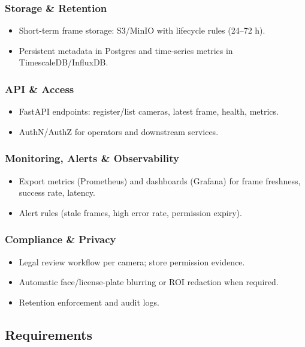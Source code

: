 \subsubsection{Storage \& Retention}
\begin{itemize}
  \item Short-term frame storage: S3/MinIO with lifecycle rules (24--72 h).
  \item Persistent metadata in Postgres and time-series metrics in TimescaleDB/InfluxDB.
\end{itemize}

\subsubsection{API \& Access}
\begin{itemize}
  \item FastAPI endpoints: register/list cameras, latest frame, health, metrics.
  \item AuthN/AuthZ for operators and downstream services.
\end{itemize}

\subsubsection{Monitoring, Alerts \& Observability}
\begin{itemize}
  \item Export metrics (Prometheus) and dashboards (Grafana) for frame freshness, success rate, latency.
  \item Alert rules (stale frames, high error rate, permission expiry).
\end{itemize}

\subsubsection{Compliance \& Privacy}
\begin{itemize}
  \item Legal review workflow per camera; store permission evidence.
  \item Automatic face/license-plate blurring or ROI redaction when required.
  \item Retention enforcement and audit logs.
\end{itemize}

\subsection{Requirements}

